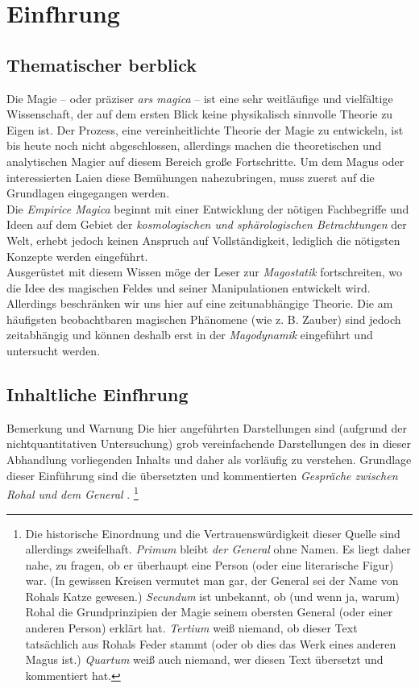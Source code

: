 \chapter[tocentry=Einführung, head=Einführung]{Einf\uech hrung}
\section[tocentry=Thematischer Überblick, head=Thematischer Überblick]{Thematischer \Uese berblick}
Die Magie -- oder präziser \emph{ars magica} -- ist eine sehr weitläufige und vielfältige Wissenschaft, der auf dem ersten Blick keine physikalisch sinnvolle Theorie zu Eigen ist. Der Prozess, eine vereinheitlichte Theorie der Magie zu entwickeln, ist bis heute noch nicht abgeschlossen, allerdings machen die theoretischen und analytischen Magier auf diesem Bereich große Fortschritte. Um dem Magus oder interessierten Laien diese Bemühungen nahezubringen, muss zuerst auf die Grundlagen eingegangen werden. \\
Die \emph{Empirice Magica} beginnt mit einer Entwicklung der nötigen Fachbegriffe und Ideen auf dem Gebiet der \emph{kosmologischen und sphärologischen Betrachtungen} der Welt, erhebt jedoch keinen Anspruch auf Vollständigkeit, lediglich die nötigsten Konzepte werden eingeführt.\\
Ausgerüstet mit diesem Wissen möge der Leser zur \emph{Magostatik} fortschreiten, wo die Idee des magischen Feldes und seiner Manipulationen entwickelt wird. Allerdings beschränken wir uns hier auf eine zeitunabhängige Theorie.
Die am häufigsten beobachtbaren magischen Phänomene (wie z. B. Zauber) sind jedoch zeitabhängig und können deshalb erst in der \emph{Magodynamik} eingeführt und untersucht werden.

\section[tocentry=Inhaltliche Einführung, head=Inhaltliche Einführung]{Inhaltliche Einf\uese hrung}
\begin{bla}{Bemerkung und Warnung}
Die hier angeführten Darstellungen sind (aufgrund der nichtquantitativen Untersuchung) grob vereinfachende Darstellungen des in dieser Abhandlung vorliegenden Inhalts und daher als vorläufig zu verstehen. Grundlage dieser Einführung sind die übersetzten und kommentierten \emph{Gespräche zwischen Rohal und dem General} \cite{rohalfragen}. 
\footnote{Die historische Einordnung und die Vertrauenswürdigkeit dieser Quelle sind allerdings zweifelhaft. \emph{Primum} bleibt \emph{der General} ohne Namen. Es liegt daher nahe, zu fragen, ob er überhaupt eine Person (oder eine literarische Figur) war. (In gewissen Kreisen vermutet man gar, der General sei der Name von Rohals Katze gewesen.) \emph{Secundum} ist unbekannt, ob (und wenn ja, warum) Rohal die Grundprinzipien der Magie seinem obersten General (oder einer anderen Person) erklärt hat. \emph{Tertium} weiß niemand, ob dieser Text tatsächlich aus Rohals Feder stammt (oder ob dies das Werk eines anderen Magus ist.) \emph{Quartum} weiß auch niemand, wer diesen Text übersetzt und kommentiert hat.}
\end{bla}

